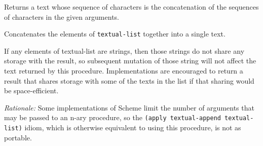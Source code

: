 \begin{entry}{%
  }

  Returns a
  text whose sequence of characters is the concatenation of the
  sequences of characters in the given arguments.
\end{entry}

\begin{entry}{%
  }

  Concatenates the elements of \texttt{textual-list} together into a
  single text.

  If any elements of textual-list are strings, then those strings do
  not share any storage with the result, so subsequent mutation of
  those string will not affect the text returned by this procedure.
  Implementations are encouraged to return a result that shares
  storage with some of the texts in the list if that sharing would be
  space-efficient.

  \emph{Rationale:} Some implementations of Scheme limit the number of
  arguments that may be passed to an n-ary procedure, so the
  \texttt{(apply\ textual-append\ textual-list)} idiom, which is
  otherwise equivalent to using this procedure, is not as portable.
\end{entry}

